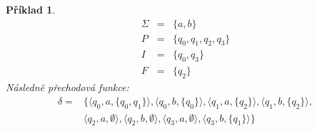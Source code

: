 \documentclass[10pt,a4paper]{article}
\theoremstyle{note}
\newtheorem{priklad}{Příklad}
\begin{document}
\begin{priklad}\label{priklad-3}
\begin{eqnarray*}
\Sigma &=& \lbrace a, b \rbrace \\
P &=& \lbrace q_{0}, q_{1}, q_{2}, q_{3} \rbrace \\
I &=& \lbrace q_{0}, q_{3} \rbrace \\
F &=& \lbrace q_{2} \rbrace 
\end{eqnarray*}
Následně přechodová funkce:
\begin{eqnarray*}
\delta =&
\lbrace
\langle q_{0}, a, \lbrace q_{0},q_{1} \rbrace \rangle,
\langle q_{0}, b, \lbrace q_{0} \rbrace \rangle,
\langle q_{1}, a, \lbrace q_{2} \rbrace \rangle,
\langle q_{1}, b, \lbrace q_{2} \rbrace \rangle, \\
& \langle q_{2}, a, \emptyset \rangle,
\langle q_{2}, b, \emptyset \rangle,
\langle q_{3}, a, \emptyset \rangle,
\langle q_{3}, b, \lbrace q_{1} \rbrace \rangle 
\rbrace
\end{eqnarray*}
\end{priklad}
\end{document}
